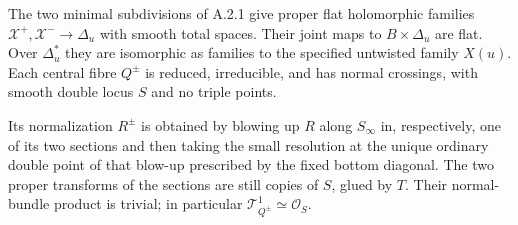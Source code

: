 \begin{theorem}[A.2.2; Proved]\label{push:A22}
The two minimal subdivisions of A.2.1 give proper flat holomorphic
families $\mathcal X^+,\mathcal X^-\to\Delta_u$ with smooth total
spaces. Their joint maps to $B\times\Delta_u$ are flat. Over
$\Delta_u^*$ they are isomorphic as families to the specified
untwisted family $X(u)$. Each central fibre $Q^\pm$ is reduced,
irreducible, and has normal crossings, with smooth double locus
$S$ and no triple points.

Its normalization $R^\pm$ is obtained by blowing up $R$ along
$S_\infty$ in, respectively, one of its two sections and then
taking the small resolution at the unique ordinary double point
of that blow-up prescribed by the fixed bottom diagonal.
The two proper transforms of the sections are still copies of
$S$, glued by $T$. Their normal-bundle product is trivial;
in particular $\mathcal T^1_{Q^\pm}\simeq\mathcal O_S$.
\end{theorem}
